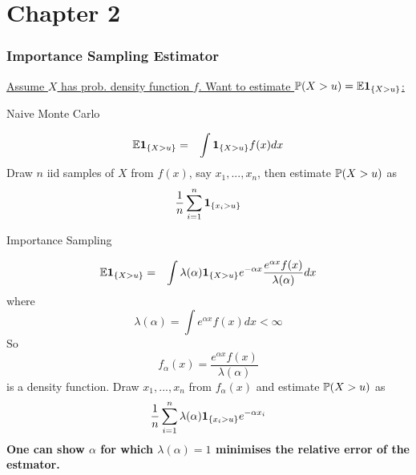 \documentclass{beamer}
\begin{document}
\section{Chapter 2}
\begin{frame}
  \frametitle{Importance Sampling Estimator}
  \underline{\scriptsize{Assume $X$ has prob. density function $f$. Want to estimate $\P(X
  > u) = \E \1{X > u}$:}}

  \begin{minipage}[t]{0.45\linewidth}
    \textcolor[HTML]{990033}{Naive Monte Carlo}
    \begin{scriptsize}
      \begin{eqnarray*}
        \E \1{X > u} &=& \int \1{X > u} f(x) dx
      \end{eqnarray*}
      Draw $n$ iid samples of $X$ from $f(x)$, say $x_1, ..., x_n$,
      then estimate $\P(X > u)$ as
      \[
      {1 \over n} \sum_{i=1}^n \1{x_i > u}
      \]
    \end{scriptsize}
  \end{minipage}\hfill
  \begin{minipage}[t]{0.5\linewidth}
    \textcolor[HTML]{990033}{Importance Sampling}
    \begin{tiny}
      \begin{eqnarray*}
        \E \1{X > u} &=& \int \lambda(\alpha)\1{X > u} e^{-\alpha x}
                         {e^{\alpha x} f(x) \over \lambda(\alpha)} dx
      \end{eqnarray*}
      where
      \[
      \lambda(\alpha) = \int e^{\alpha x} f(x) dx < \infty
      \]
      So
      \[
      f_\alpha(x) = \frac{e^{\alpha x} f(x)}{\lambda(\alpha)}
      \]
      is a density function. Draw $x_1, ..., x_n$ from
      $f_\alpha(x)$ and estimate $\P(X > u)$ as
      \[
      {1\over n}\sum_{i=1}^n \lambda(\alpha) \1{x_i > u} e^{-\alpha x_i}
      \]
      \bf{One can show $\alpha$ for which
        $\lambda(\alpha) = 1$ minimises the relative error of the
        estmator.}
    \end{tiny}
  \end{minipage}
\end{frame}
\end{document}

